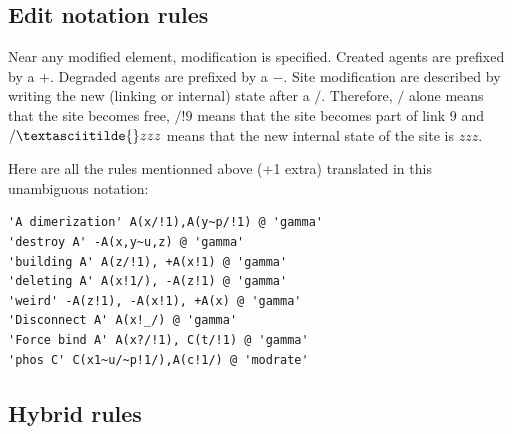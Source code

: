 \documentclass[11pt]{book}
\def\intstate{\textasciitilde}
\begin{document}
\subsection{Edit notation rules}

Near any modified element, modification is specified. Created agents
are prefixed by a $+$. Degraded agents are prefixed by a $-$. Site
modification are described by writing the new (linking or internal)
state after a $/$. Therefore, $/$ alone means that the site becomes
free, $/!9$ means that the site becomes part of link $9$ and $/\intstate{}zzz$
means that the new internal state of the site is $zzz$.

Here are all the rules mentionned above (+1 extra) translated in this
unambiguous notation:
\begin{lstlisting}[language=kappa]
'A dimerization' A(x/!1),A(y~p/!1) @ 'gamma'
'destroy A' -A(x,y~u,z) @ 'gamma'
'building A' A(z/!1), +A(x!1) @ 'gamma'
'deleting A' A(x!1/), -A(z!1) @ 'gamma'
'weird' -A(z!1), -A(x!1), +A(x) @ 'gamma'
'Disconnect A' A(x!_/) @ 'gamma'
'Force bind A' A(x?/!1), C(t/!1) @ 'gamma'
'phos C' C(x1~u/~p!1/),A(c!1/) @ 'modrate'
\end{lstlisting}

\subsection{Hybrid rules}\label{sec:hybrid}
\end{document}
